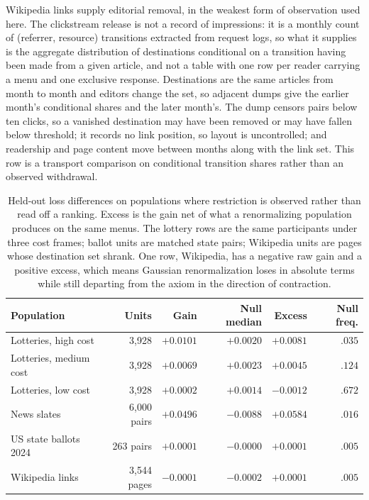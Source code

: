 \documentclass[11pt]{article}
\theoremstyle{italichead}
\begin{document}
Wikipedia links supply editorial removal, in the weakest form of observation used here. The
clickstream release is not a record of impressions: it is a monthly count of (referrer, resource)
transitions extracted from request logs, so what it supplies is the aggregate distribution of
destinations conditional on a transition having been made from a given article, and not a table
with one row per reader carrying a menu and one exclusive response. Destinations are the same
articles from month to month and editors change the set, so adjacent dumps give the earlier
month's conditional shares and the later month's. The dump censors pairs below ten clicks, so a
vanished destination may have been removed or may have fallen below threshold; it records no link
position, so layout is uncontrolled; and readership and page content move between months along
with the link set. This row is a transport comparison on conditional transition shares rather
than an observed withdrawal.

\begin{table}[htbp]
\centering
\small
\begin{tabular}{lrrrrr}
\toprule
Population & Units & Gain & Null median & Excess & Null freq. \\
\midrule
Lotteries, high cost & 3{,}928 & $+0.0101$ & $+0.0020$ & $+0.0081$ & $.035$ \\
Lotteries, medium cost & 3{,}928 & $+0.0069$ & $+0.0023$ & $+0.0045$ & $.124$ \\
Lotteries, low cost & 3{,}928 & $+0.0002$ & $+0.0014$ & $-0.0012$ & $.672$ \\
News slates & 6{,}000 pairs & $+0.0496$ & $-0.0088$ & $+0.0584$ & $.016$ \\
US state ballots 2024 & 263 pairs & $+0.0001$ & $-0.0000$ & $+0.0001$ & $.005$ \\
Wikipedia links & 3{,}544 pages & $-0.0001$ & $-0.0002$ & $+0.0001$ & $.005$ \\
\bottomrule
\end{tabular}
\caption{Held-out loss differences on populations where restriction is observed rather
than read off a ranking. Excess is the gain net of what a renormalizing population
produces on the same menus. The lottery rows are the same participants under three cost
frames; ballot units are matched state pairs; Wikipedia units are pages whose destination set shrank. One row, Wikipedia, has a
negative raw gain and a positive excess, which means Gaussian renormalization loses in absolute
terms while still departing from the axiom in the direction of contraction.}
\label{tab:more}
\end{table}
\end{document}
